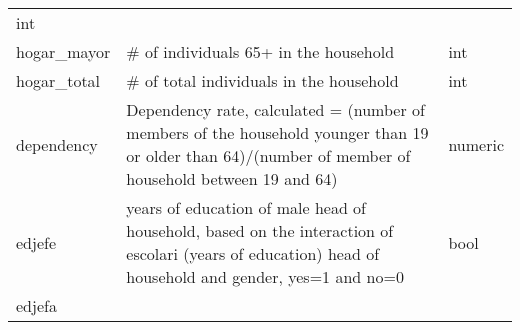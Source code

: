 \documentclass[11pt]{article}
\begin{document}
\begin{longtable}[]{@{}lll@{}}
\begin{minipage}[t]{0.24\columnwidth}
int\strut
\end{minipage}\tabularnewline
\begin{minipage}[t]{0.19\columnwidth}\raggedright\strut
hogar\_mayor\strut
\end{minipage} & \begin{minipage}[t]{0.16\columnwidth}\raggedright\strut
\# of individuals 65+ in the household\strut
\end{minipage} & \begin{minipage}[t]{0.24\columnwidth}\raggedright\strut
int\strut
\end{minipage}\tabularnewline
\begin{minipage}[t]{0.19\columnwidth}\raggedright\strut
hogar\_total\strut
\end{minipage} & \begin{minipage}[t]{0.16\columnwidth}\raggedright\strut
\# of total individuals in the household\strut
\end{minipage} & \begin{minipage}[t]{0.24\columnwidth}\raggedright\strut
int\strut
\end{minipage}\tabularnewline
\begin{minipage}[t]{0.19\columnwidth}\raggedright\strut
dependency\strut
\end{minipage} & \begin{minipage}[t]{0.16\columnwidth}\raggedright\strut
Dependency rate, calculated = (number of members of the household
younger than 19 or older than 64)/(number of member of household between
19 and 64)\strut
\end{minipage} & \begin{minipage}[t]{0.24\columnwidth}\raggedright\strut
numeric\strut
\end{minipage}\tabularnewline
\begin{minipage}[t]{0.19\columnwidth}\raggedright\strut
edjefe\strut
\end{minipage} & \begin{minipage}[t]{0.16\columnwidth}\raggedright\strut
years of education of male head of household, based on the interaction
of escolari (years of education) head of household and gender, yes=1 and
no=0\strut
\end{minipage} & \begin{minipage}[t]{0.24\columnwidth}\raggedright\strut
bool\strut
\end{minipage}\tabularnewline
\begin{minipage}[t]{0.19\columnwidth}\raggedright\strut
edjefa\strut
\end{minipage} & \begin{minipage}[t]{0.16\columnwidth}\raggedright\strut

\end{minipage}
\end{longtable}
\end{document}
